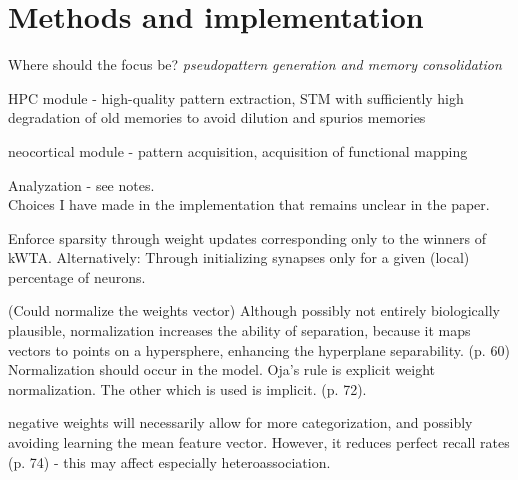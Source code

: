 
\chapter{Methods and implementation}\label{chpt:methods}
Where should the focus be? \textit{pseudopattern generation and memory consolidation}

HPC module - high-quality pattern extraction, STM with sufficiently high degradation of old memories to avoid dilution and spurios memories

neocortical module - pattern acquisition, acquisition of functional mapping

Analyzation - see notes.
\\

Choices I have made in the implementation that remains unclear in the paper.

Enforce sparsity through weight updates corresponding only to the winners of kWTA.
Alternatively: Through initializing synapses only for a given (local) percentage of neurons.

(Could normalize the weights vector)
Although possibly not entirely biologically plausible, normalization increases the ability of separation, because it maps vectors to points on a hypersphere, enhancing the hyperplane separability. (p. 60)
Normalization should occur in the model. Oja's rule is explicit weight normalization. The other which is used is implicit. (p. 72).

negative weights will necessarily allow for more categorization, and possibly avoiding learning the mean feature vector. However, it reduces perfect recall rates (p. 74) - this may affect especially heteroassociation.